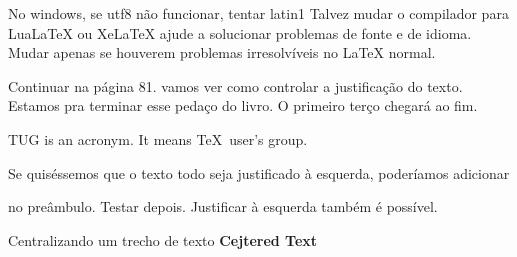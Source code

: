 \documentclass{article}
\begin{document}
No windows, se utf8 não funcionar, tentar latin1
Talvez mudar o compilador para LuaLaTeX ou XeLaTeX ajude a solucionar
problemas de fonte e de idioma.
Mudar apenas se houverem problemas irresolvíveis no LaTeX normal.

Continuar na página 81. vamos ver como controlar a justificação do texto.
Estamos pra terminar esse pedaço do livro. O primeiro terço chegará ao fim.

\parbox{3cm}{\raggedright
    TUG is an acronym. It means \TeX\ user's group.
}
Se quiséssemos que o texto todo seja justificado à esquerda, poderíamos
adicionar \raggedright no preâmbulo. 
Testar depois.
Justificar à esquerda também é possível.

Centralizando um trecho de texto
{\centering
\huge\bfseries Cejtered Text \\

    }
\end{document}
